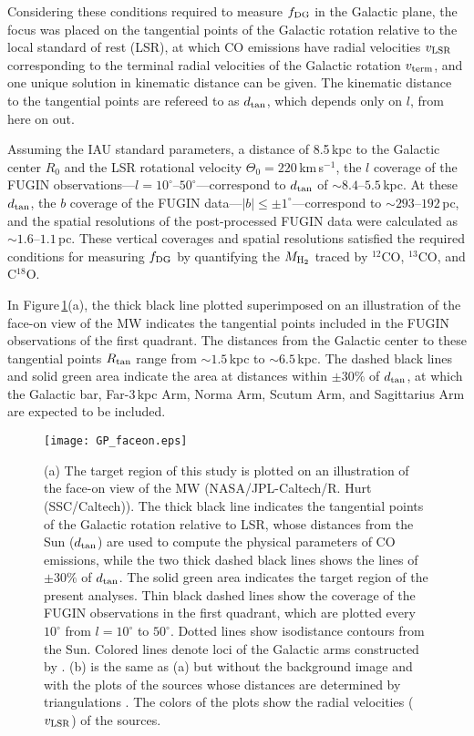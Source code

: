 \documentclass[proof]{pasj01}
\newcommand{\fDG}{f_{\rm DG}}
\begin{document}
Considering these conditions required to measure $f_{\rm DG}$ in the Galactic plane, the focus was placed on the tangential points of the Galactic rotation relative to the local standard of rest (LSR), at which CO emissions have radial velocities $v_{\rm LSR}$ corresponding to the terminal radial velocities of the Galactic rotation $v_{\rm term}$, and one unique solution in kinematic distance can be given. 
The kinematic distance to the tangential points are refereed to as $d_{\rm tan}$, which depends only on $l$, from here on out.

Assuming the IAU standard parameters, a distance of 8.5\,kpc to the Galactic center $R_0$ and the LSR rotational velocity $\Theta_0 = 220$\,km\,s$^{-1}$, the $l$ coverage of the FUGIN observations---$l=10^\circ$--$50^\circ$---correspond to $d_{\rm tan}$ of $\sim8.4$--$5.5$\,kpc.
At these $d_{\rm tan}$, the $b$ coverage of the FUGIN data---$|b| \leq \pm1^\circ$---correspond to $\sim293$--$192$\,pc, and the spatial resolutions of the post-processed FUGIN data were calculated as $\sim1.6$--$1.1$\,pc. These vertical coverages and spatial resolutions satisfied the required conditions for measuring $\fDG$ by quantifying the $M_{\rm H_2}$ traced by $^{12}$CO, $^{13}$CO, and C$^{18}$O.

In Figure\,\ref{fig:faceon}(a), the thick black line plotted superimposed on an illustration of the face-on view of the MW indicates the tangential points included in the FUGIN observations of the first quadrant.
The distances from the Galactic center to these tangential points $R_{\rm tan}$ range from $\sim1.5$\,kpc to $\sim6.5$\,kpc.
The dashed black lines and solid green area indicate the area at distances within $\pm30\%$ of $d_{\rm tan}$, at which the Galactic bar, Far-3\,kpc Arm, Norma Arm, Scutum Arm, and Sagittarius Arm are expected to be included.


\begin{figure}
 \begin{center}
  \texttt{[image: GP\_faceon.eps]}
 \end{center}
 \caption{(a) The target region of this study is plotted on an illustration of the face-on view of the MW (NASA/JPL-Caltech/R. Hurt (SSC/Caltech)). The thick black line indicates the tangential points of the Galactic rotation relative to LSR, whose distances from the Sun ($d_{\rm tan}$) are used to compute the physical parameters of CO emissions, while the two thick dashed black lines shows the lines of $\pm30\%$ of $d_{\rm tan}$. The solid green area indicates the target region of the present analyses. Thin black dashed lines show the coverage of the FUGIN observations in the first quadrant, which are plotted every $10^\circ$ from $l=10^\circ$ to $50^\circ$. Dotted lines show isodistance contours from the Sun. Colored lines denote loci of the Galactic arms constructed by \citet{rei2016}.
 (b) is the same as (a) but without the background image and with the plots of the sources whose distances are determined by triangulations \citep{hou2014}. The colors of the plots show the radial velocities ($v_{\rm LSR}$) of the sources.
}\label{fig:faceon}
\end{figure}
\end{document}
